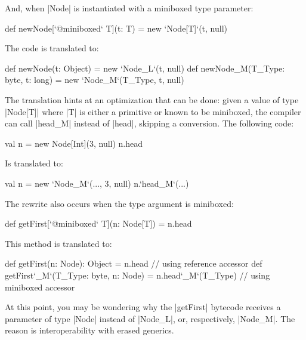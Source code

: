 And, when |Node| is instantiated with a miniboxed type parameter:

\begin{lstlisting-nobreak}
 def newNode[`@miniboxed` T](t: T) =
   new `Node[T]`(t, null)
\end{lstlisting-nobreak}

The code is translated to:

\begin{lstlisting-nobreak}
 def newNode(t: Object) =
   new `Node_L`(t, null)
 def newNode_M(T_Type: byte, t: long) =
   new `Node_M`(T_Type, t, null)
\end{lstlisting-nobreak}

The translation hints at an optimization that can be done: given a value of type |Node[T]| where |T| is either a primitive or known to be miniboxed, the compiler can call |head_M| instead of |head|, skipping a conversion. The following code:

\begin{lstlisting-nobreak}
 val n = new Node[Int](3, null)
 n.head
\end{lstlisting-nobreak}

Is translated to:

\begin{lstlisting-nobreak}
 val n = new `Node_M`(..., 3, null)
 n.`head_M`(...)
\end{lstlisting-nobreak}

The rewrite also occurs when the type argument is miniboxed:

\begin{lstlisting-nobreak}
 def getFirst[`@miniboxed` T](n: Node[T]) = n.head
\end{lstlisting-nobreak}

This method is translated to:

\begin{lstlisting-nobreak}
 def getFirst(n: Node): Object =
   n.head                 // using reference accessor
 def getFirst`_M`(T_Type: byte, n: Node) =
   n.head`_M`(T_Type) // using miniboxed accessor
\end{lstlisting-nobreak}

At this point, you may be wondering why the |getFirst| bytecode receives a parameter of type |Node| instead of |Node_L|, or, respectively, |Node_M|. The reason is interoperability with erased generics.



